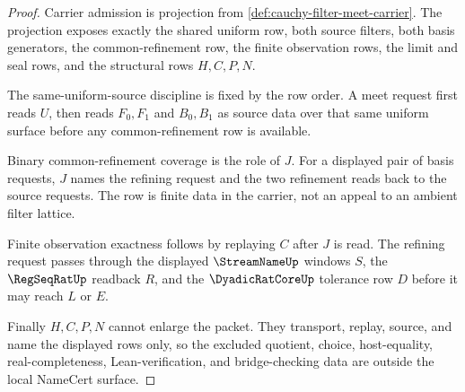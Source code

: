 \begin{proof}
Carrier admission is projection from \autoref{def:cauchy-filter-meet-carrier}. The projection exposes exactly the shared uniform row, both source filters, both basis generators, the common-refinement row, the finite observation rows, the limit and seal rows, and the structural rows $H,C,P,N$.

The same-uniform-source discipline is fixed by the row order. A meet request first reads $U$, then reads $F_0,F_1$ and $B_0,B_1$ as source data over that same uniform surface before any common-refinement row is available.

Binary common-refinement coverage is the role of $J$. For a displayed pair of basis requests, $J$ names the refining request and the two refinement reads back to the source requests. The row is finite data in the carrier, not an appeal to an ambient filter lattice.

Finite observation exactness follows by replaying $C$ after $J$ is read. The refining request passes through the displayed $\StreamNameUp$ windows $S$, the $\RegSeqRatUp$ readback $R$, and the $\DyadicRatCoreUp$ tolerance row $D$ before it may reach $L$ or $E$.

Finally $H,C,P,N$ cannot enlarge the packet. They transport, replay, source, and name the displayed rows only, so the excluded quotient, choice, host-equality, real-completeness, Lean-verification, and bridge-checking data are outside the local NameCert surface.
\end{proof}

